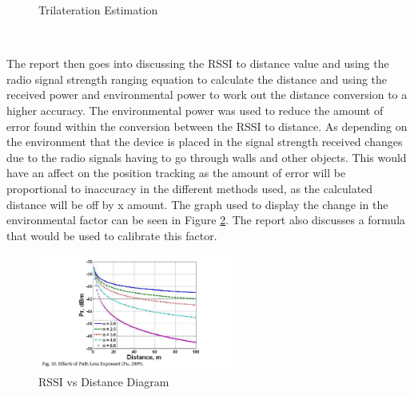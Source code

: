 \documentclass{report}
\begin{document}
\begin{enumerate}
\begin{figure}[h!]
    \caption{Trilateration Estimation\cite{IndoorTrackingRSSI}}
    \label{fig:Trilateration_Estimation}
\end{figure} \\
\end{enumerate}{}
The report then goes into discussing the RSSI to distance value and using the radio signal strength ranging equation to calculate the distance and using the received power and environmental power to work out the distance conversion to a higher accuracy. The environmental power was used to reduce the amount of error found within the conversion between the RSSI to distance. As depending on the environment that the device is placed in the signal strength received changes due to the radio signals having to go through walls and other objects. This would have an affect on the position tracking as the amount of error will be proportional to inaccuracy in the different methods used, as the calculated distance will be off by x amount.   The graph used to display the change in the environmental factor can be seen in Figure \ref{fig:RSSI vs Distance Diagram}. The report also discusses a formula that would be used to calibrate this factor. \\ \newline

\begin{figure}[h!]
    \centering
    \includegraphics[width=250]{Indoor_locational_tracking_RSSI_Distance_graph.PNG} 
    \caption{RSSI vs Distance Diagram\cite{IndoorTrackingRSSI}}
    \label{fig:RSSI vs Distance Diagram}
\end{figure} \\
\end{document}
